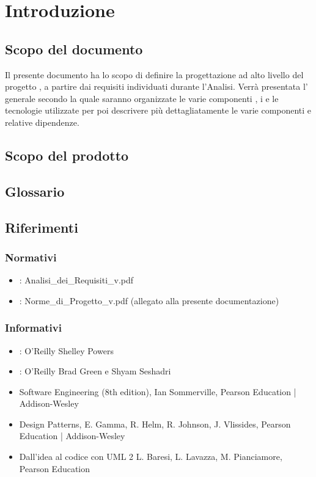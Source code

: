 \newpage
\section{Introduzione}
\subsection{Scopo del documento}
Il presente documento ha lo scopo di definire la progettazione ad alto livello del progetto \textbf{}, a partire dai requisiti individuati durante l'Analisi. Verrà presentata l' generale secondo la quale saranno organizzate le varie componenti , i  e le tecnologie utilizzate per poi descrivere più dettagliatamente le varie componenti e relative dipendenze.

\subsection{Scopo del prodotto}
\Prodotto{}

\subsection{Glossario}
\Glossario{}

\subsection{Riferimenti}

\subsubsection{Normativi}
\begin{itemize}
\item {}: Analisi\_{}dei\_{}Requisiti\_{}v\versioneAnalisiDeiRequisiti{}.pdf
\item {}: Norme\_{}di\_{}Progetto\_{}v\versioneNormeDiProgetto{}.pdf  (allegato alla presente documentazione)\\
\end{itemize}

\subsubsection{Informativi}
\begin{itemize}
\item {}: O'Reilly Shelley Powers
\item {}: O'Reilly Brad Green e Shyam Seshadri
\item Software Engineering (8th edition), Ian Sommerville, Pearson Education | Addison-Wesley
\item Design Patterns, E. Gamma, R. Helm, R. Johnson, J. Vlissides, Pearson Education | Addison-Wesley
\item Dall'idea al codice con UML 2       L. Baresi, L. Lavazza, M. Pianciamore, Pearson Education
\end{itemize}

